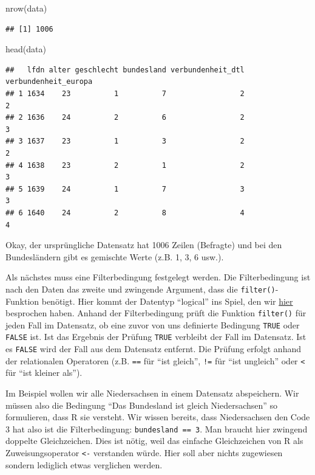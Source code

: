 \documentclass[
]{book}
\newenvironment{Shaded}{\begin{snugshade}}{\end{snugshade}}
\newcommand{\FunctionTok}[1]{\textcolor[rgb]{0.00,0.00,0.00}{#1}}
\newcommand{\NormalTok}[1]{#1}
\begin{document}
\begin{Shaded}
\begin{Highlighting}[]
\FunctionTok{nrow}\NormalTok{(data)}
\end{Highlighting}
\end{Shaded}

\begin{verbatim}
## [1] 1006
\end{verbatim}

\begin{Shaded}
\begin{Highlighting}[]
\FunctionTok{head}\NormalTok{(data)}
\end{Highlighting}
\end{Shaded}

\begin{verbatim}
##   lfdn alter geschlecht bundesland verbundenheit_dtl verbundenheit_europa
## 1 1634    23          1          7                 2                    2
## 2 1636    24          2          6                 2                    3
## 3 1637    23          1          3                 2                    2
## 4 1638    23          2          1                 2                    3
## 5 1639    24          1          7                 3                    3
## 6 1640    24          2          8                 4                    4
\end{verbatim}

Okay, der ursprüngliche Datensatz hat 1006 Zeilen (Befragte) und bei den Bundesländern gibt es gemischte Werte (z.B. 1, 3, 6 usw.).

Als nächstes muss eine Filterbedingung festgelegt werden. Die Filterbedingung ist nach den Daten das zweite und zwingende Argument, dass die \texttt{filter()}-Funktion benötigt. Hier kommt der Datentyp ``logical'' ins Spiel, den wir \protect\hyperlink{atomic_vector_types}{hier} besprochen haben. Anhand der Filterbedingung prüft die Funktion \texttt{filter()} für jeden Fall im Datensatz, ob eine zuvor von uns definierte Bedingung \texttt{TRUE} oder \texttt{FALSE} ist. Ist das Ergebnis der Prüfung \texttt{TRUE} verbleibt der Fall im Datensatz. Ist es \texttt{FALSE} wird der Fall aus dem Datensatz entfernt. Die Prüfung erfolgt anhand der relationalen Operatoren (z.B. \texttt{==} für ``ist gleich'', \texttt{!=} für ``ist ungleich'' oder \texttt{\textless{}} für ``ist kleiner als'').

Im Beispiel wollen wir alle Niedersachsen in einem Datensatz abspeichern. Wir müssen also die Bedingung ``Das Bundesland ist gleich Niedersachsen'' so formulieren, dass R sie versteht. Wir wissen bereits, dass Niedersachsen den Code 3 hat also ist die Filterbedingung: \texttt{bundesland\ ==\ 3}. Man braucht hier zwingend doppelte Gleichzeichen. Dies ist nötig, weil das einfache Gleichzeichen von R als Zuweisungsoperator \texttt{\textless{}-} verstanden würde. Hier soll aber nichts zugewiesen sondern lediglich etwas verglichen werden.
\end{document}
